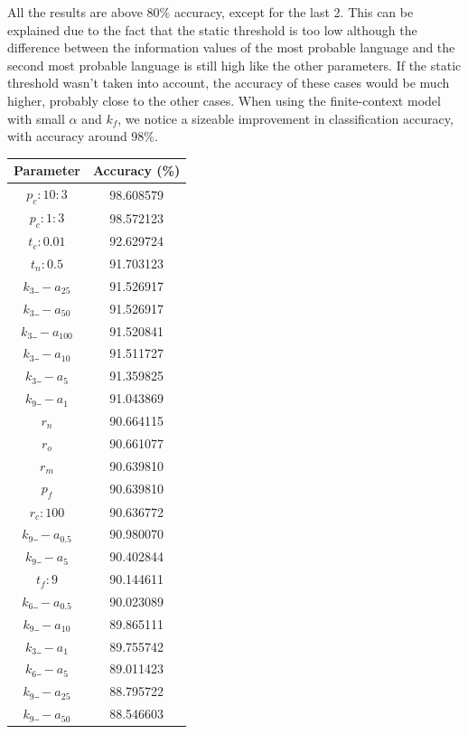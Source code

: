 \documentclass{article}
\begin{document}
All the results are above 80\% accuracy, except for the last 2. This can be explained due to the fact that the static threshold is too low
although the difference between the information values of the most probable language and the second most probable language is still high like the other parameters.
If the static threshold wasn't taken into account, the accuracy of these cases would be much higher, probably close to the other cases. 
When using the finite-context model with small $\alpha$ and $k_f$, we notice a sizeable improvement in classification accuracy, with accuracy around 98\%.

\begin{tabular}{|c|c|}
    \hline
    \textbf{Parameter} & \textbf{Accuracy (\%)} \\ \hline
    $p_c:10:3$ & 98.608579 \\ \hline
    $p_c:1:3$ & 98.572123 \\ \hline
    $t_c:0.01$ & 92.629724 \\ \hline
    $t_n:0.5$ & 91.703123 \\ \hline
    $k_3\_-a_{25}$ & 91.526917 \\ \hline
    $k_3\_-a_{50}$ & 91.526917 \\ \hline
    $k_3\_-a_{100}$ & 91.520841 \\ \hline
    $k_3\_-a_{10}$ & 91.511727 \\ \hline
    $k_3\_-a_5$ & 91.359825 \\ \hline
    $k_9\_-a_1$ & 91.043869 \\ \hline
    $r_n$ & 90.664115 \\ \hline
    $r_o$ & 90.661077 \\ \hline
    $r_m$ & 90.639810 \\ \hline
    $p_f$ & 90.639810 \\ \hline
    $r_c:100$ & 90.636772 \\ \hline
    $k_9\_-a_{0.5}$ & 90.980070 \\ \hline
    $k_9\_-a_5$ & 90.402844 \\ \hline
    $t_f:9$ & 90.144611 \\ \hline
    $k_6\_-a_{0.5}$ & 90.023089 \\ \hline
    $k_9\_-a_{10}$ & 89.865111 \\ \hline
    $k_3\_-a_1$ & 89.755742 \\ \hline
    $k_6\_-a_5$ & 89.011423 \\ \hline
    $k_9\_-a_{25}$ & 88.795722 \\ \hline
    $k_9\_-a_{50}$ & 88.546603 \\ \hline

\end{tabular}
\end{document}
